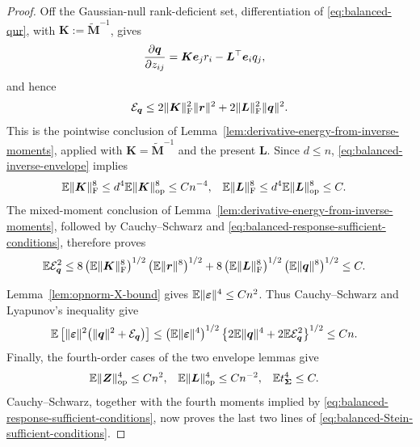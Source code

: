 \documentclass{article}
\theoremstyle{plain}
\theoremstyle{definition}
\theoremstyle{definition}
\DeclarePairedDelimiter\norm{\lVert}{\rVert}
\def\E{{\mathbb{E}}}
\def\mathbold{\boldsymbol}
\def\bK{\mathbold{K}}\def\hbK{{\widehat{\bK}}}\def\tbK{{\widetilde{\bK}}}
\def\bL{\mathbold{L}}\def\hbL{{\widehat{\bL}}}\def\tbL{{\widetilde{\bL}}}
\def\bM{\mathbold{M}}\def\hbM{{\widehat{\bM}}}\def\tbM{{\widetilde{\bM}}}
\def\bq{\mathbold{q}}\def\qhat{\widehat{q}}\def\qtil{\widetilde{q}}\def\qbar{{\overline q}}
\def\br{\mathbold{r}}\def\rhat{\widehat{r}}\def\rtil{\widetilde{r}}\def\rbar{{\overline r}}
\def\be{\mathbold{e}}
\def\bZ{\mathbold{Z}}\def\hbZ{{\widehat{\bZ}}}\def\tbZ{{\widetilde{\bZ}}}
\def\ep{\varepsilon}\def\eps{\epsilon}\def\veps{\varepsilon}
\def\bep{ {\mathbold{\ep} }}
\def\bSigma{\mathbold{\Sigma}}\def\hbSigma{{\widehat{\bSigma}}}
\begin{document}
\begin{proof}
Off the Gaussian-null rank-deficient set, differentiation of
\eqref{eq:balanced-qur}, with $\bK:=\widetilde{\bM}^{-1}$, gives
\begin{align}
    \pdv{\bq}{z_{ij}}
    &=\bK\be_jr_i-\bL^\top\be_iq_j,
    \label{eq:balanced-dot-q}
\end{align}
and hence
\begin{align}
    \calE_{\bq}
    \leq
      2\norm{\bK}_{\rm F}^2\norm{\br}^2
      +2\norm{\bL}_{\rm F}^2\norm{\bq}^2.
    \label{eq:balanced-Dq-energy}
\end{align}
This is the pointwise conclusion of
Lemma~\ref{lem:derivative-energy-from-inverse-moments}, applied with
$\bK=\widetilde{\bM}^{-1}$ and the present $\bL$.
Since $d\leq n$, \eqref{eq:balanced-inverse-envelope} implies
\begin{align*}
    \E\norm{\bK}_{\rm F}^{8}
    &\leq d^4\E\norm{\bK}_{\rm op}^{8}\leq Cn^{-4},
    &
    \E\norm{\bL}_{\rm F}^{8}
    &\leq d^4\E\norm{\bL}_{\rm op}^{8}\leq C.
\end{align*}
The mixed-moment conclusion of
Lemma~\ref{lem:derivative-energy-from-inverse-moments}, followed by
Cauchy--Schwarz and \eqref{eq:balanced-response-sufficient-conditions},
therefore proves
\begin{align*}
    \E\calE_{\bq}^2
    &\leq
      8\left(\E\norm{\bK}_{\rm F}^{8}\right)^{1/2}
        \left(\E\norm{\br}^{8}\right)^{1/2}
      +8\left(\E\norm{\bL}_{\rm F}^{8}\right)^{1/2}
        \left(\E\norm{\bq}^{8}\right)^{1/2}
      \leq C.
\end{align*}

Lemma~\ref{lem:opnorm-X-bound} gives
$\E\norm{\bep}^{4}\leq Cn^2$.  Thus Cauchy--Schwarz and Lyapunov's
inequality give
\begin{align*}
    \E\left[
       \norm{\bep}^{2}
       \bigl(\norm{\bq}^{2}+\calE_{\bq}\bigr)
    \right]
    &\leq
    \left(\E\norm{\bep}^{4}\right)^{1/2}
    \left\{2\E\norm{\bq}^{4}+2\E\calE_{\bq}^{2}\right\}^{1/2}
    \leq Cn.
\end{align*}
Finally, the fourth-order cases of the two envelope lemmas give
\begin{align*}
    \E\norm{\bZ}_{\rm op}^{4}&\leq Cn^2,
    & \E\norm{\bL}_{\rm op}^{4}&\leq Cn^{-2},
    & \E t_{\bSigma}^{4}&\leq C.
\end{align*}
Cauchy--Schwarz, together with the fourth moments implied by
\eqref{eq:balanced-response-sufficient-conditions}, now proves the last two
lines of \eqref{eq:balanced-Stein-sufficient-conditions}.


\end{proof}
\end{document}
